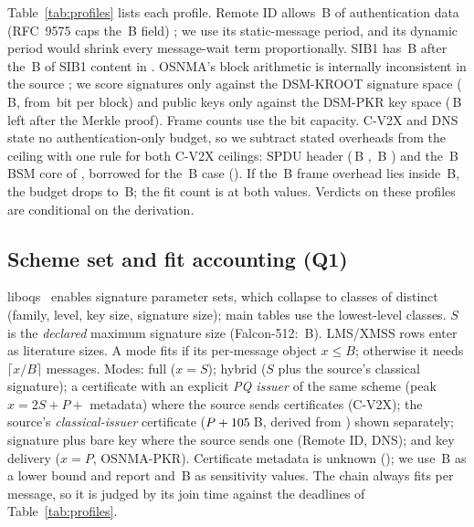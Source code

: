 \documentclass[conference]{IEEEtran}
\newcommand{\mode}[1]{\textsf{#1}}
\begin{document}
Table~\ref{tab:profiles} lists each profile. Remote ID allows \BudRID\,B of
authentication data (RFC~9575 caps the \CeilRID\,B field)
\cite{wiethuechter2024drip}; we use its \PerRID{} static-message period,
and its \RIDDynPer{} dynamic period would shrink every message-wait term
proportionally. SIB1 has \BudSIB\,B after the \SIBUsed\,B of SIB1 content in
\cite{darzi2026a}. OSNMA's block arithmetic is internally inconsistent in
the source \cite{junquera2023assessment}; we score signatures only against
the DSM-KROOT signature space (\BudKROOT\,B, from \OSKROOTbits\,bit per
block) and public keys only against the DSM-PKR key space (\BudPKR\,B left
after the Merkle proof). Frame counts use the bit capacity. C-V2X and DNS
state no authentication-only budget, so we subtract stated overheads from
the ceiling with one rule for both C-V2X ceilings: SPDU header
(\HdrSPDUCV\,B \cite{twardokus2024when}, \HdrJ\,B \cite{abrar2026deployment})
and the \BSMCore\,B BSM core of \cite{abrar2026deployment}, borrowed for the
\CeilCV\,B case (\BSMSizeCV). If the \FrameCV\,B frame overhead lies inside
\CeilCV\,B, the budget drops to \BudCVSens\,B; the fit count is
\FitCVSens{} at both values. Verdicts on these profiles are conditional on
the derivation.

\subsection{Scheme set and fit accounting (Q1)}

liboqs~\LibOQSVersion{} \cite{oqs2026liboqs} enables \NumParamSets{}
signature parameter sets, which collapse to \NumClasses{} classes of
distinct (family, level, key size, signature size); main tables use the
\NumClassesLow{} lowest-level classes. $S$ is the \emph{declared} maximum
signature size (Falcon-512: \SigFalcon\,B). \NumStateful{} LMS/XMSS rows
enter as literature sizes. A mode fits if its per-message object $x\le B$;
otherwise it needs $\lceil x/B\rceil$ messages. Modes: \mode{full} ($x=S$);
\mode{hybrid} ($S$ plus the source's classical signature); a certificate
with an explicit \emph{PQ issuer} of the same scheme (peak $x=2S+P+$
metadata) where the source sends certificates (C-V2X); the source's
\emph{classical-issuer} certificate ($P+105$\,B, derived from
\cite{abrar2026deployment}) shown separately; signature plus bare key
where the source sends one (Remote ID, DNS); and key delivery ($x=P$,
OSNMA-PKR). Certificate metadata is unknown (\CertMeta); we use \CertMetaUsed\,B as a
lower bound and report \CertMetaLo{} and \CertMetaHi\,B as sensitivity
values. The chain always fits per message, so it is judged by its join
time against the deadlines of Table~\ref{tab:profiles}.
\end{document}
